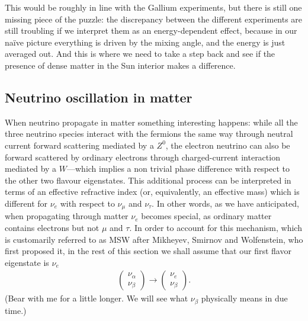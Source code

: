 This would be roughly in line with the Gallium experiments, but there is still one
missing piece of the puzzle: the discrepancy between the different experiments are
still troubling if we interpret them as an energy-dependent effect, because in
our na\"ive picture everything is driven by the mixing angle, and the energy is
just averaged out. And this is where we need to take a step back and see if the
presence of dense matter in the Sun interior makes a difference.


\subsection{Neutrino oscillation in matter}
\label{sec:nu_oscillation_matter}

When neutrino propagate in matter something interesting happens: while all the
three neutrino species interact with the fermions the same way through neutral current
forward scattering mediated by a $Z^0$, the electron neutrino can also be forward
scattered by ordinary electrons through charged-current interaction mediated by
a $W$---which implies a non trivial phase difference with respect to the other two
flavour eigenstates. This additional process can be interpreted in terms of an
effective refractive index (or, equivalently, an effective mass) which is different
for $\nu_e$ with respect to $\nu_\mu$ and $\nu_\tau$.
In other words, as we have anticipated, when propagating through matter $\nu_e$ becomes
special, as ordinary matter contains electrons but not $\mu$ and $\tau$. In order to
account for this mechanism, which is customarily referred to as MSW after Mikheyev,
Smirnov and Wolfenstein, who first proposed it, in the rest of  this section we shall
assume that our first flavor eigenstate is $\nu_e$
\begin{align*}
  \begin{pmatrix}\nu_\alpha\\ \nu_\beta\end{pmatrix} \rightarrow
  \begin{pmatrix}\nu_e\\ \nu_\beta\end{pmatrix}.
\end{align*}
(Bear with me for a little longer. We will see what $\nu_\beta$ physically means
in due time.)

